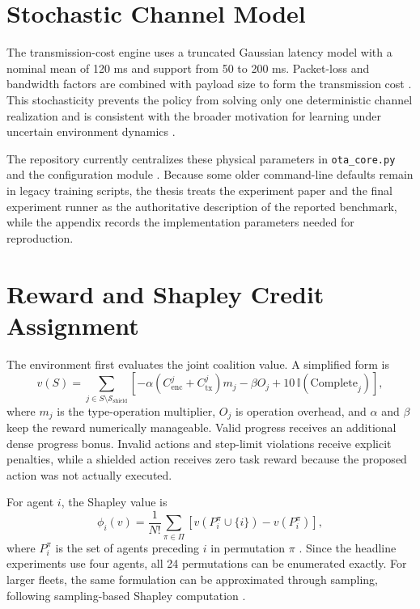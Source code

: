 \documentclass{iutbscthesis}
\begin{document}
\section{Stochastic Channel Model}
The transmission-cost engine uses a truncated Gaussian latency model with a nominal mean of 120 ms and support from 50 to 200 ms. Packet-loss and bandwidth factors are combined with payload size to form the transmission cost \parencite{ma_reles_ota_repo}. This stochasticity prevents the policy from solving only one deterministic channel realization and is consistent with the broader motivation for learning under uncertain environment dynamics \parencite{sutton2018rl}.

The repository currently centralizes these physical parameters in \texttt{ota\_core.py} and the configuration module \parencite{ma_reles_ota_repo}. Because some older command-line defaults remain in legacy training scripts, the thesis treats the experiment paper and the final experiment runner as the authoritative description of the reported benchmark, while the appendix records the implementation parameters needed for reproduction.

\section{Reward and Shapley Credit Assignment}\label{sec:reward}
The environment first evaluates the joint coalition value. A simplified form is
\begin{equation}
v(S)=\sum_{j\in S\setminus\mathcal{S}_{\mathrm{shield}}}
\left[-\alpha(C_{\mathrm{enc}}^j+C_{\mathrm{tx}}^j)m_j-\beta O_j+10\,\mathbb{I}(\mathrm{Complete}_j)\right],
\end{equation}
where $m_j$ is the type-operation multiplier, $O_j$ is operation overhead, and $\alpha$ and $\beta$ keep the reward numerically manageable. Valid progress receives an additional dense progress bonus. Invalid actions and step-limit violations receive explicit penalties, while a shielded action receives zero task reward because the proposed action was not actually executed.

For agent $i$, the Shapley value is
\begin{equation}
\phi_i(v)=\frac{1}{N!}\sum_{\pi\in\Pi}\left[v(P_i^\pi\cup\{i\})-v(P_i^\pi)\right],
\end{equation}
where $P_i^\pi$ is the set of agents preceding $i$ in permutation $\pi$ \parencite{shapley1953value}. Since the headline experiments use four agents, all 24 permutations can be enumerated exactly. For larger fleets, the same formulation can be approximated through sampling, following sampling-based Shapley computation \parencite{castro2009shapley}.
\end{document}
